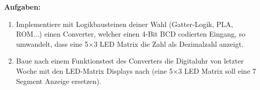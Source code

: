 \documentclass[a4paper]{scrartcl}
\begin{document}
\textbf{Aufgaben:}
\begin{enumerate}
  \item Implementiere mit Logikbausteinen deiner Wahl (Gatter-Logik, PLA, ROM...) einen Converter, welcher einen 4-Bit BCD codierten Eingang, so umwandelt, dass eine 5$\times$3 LED Matrix die Zahl als Dezimalzahl
  anzeigt.
  \item Baue nach einem Funktionstest des Converters die Digitaluhr von letzter Woche mit den LED-Matrix Displays nach (eine 5$\times$3 LED Matrix soll eine 7 Segment Anzeige ersetzen).
\end{enumerate}
\end{document}
